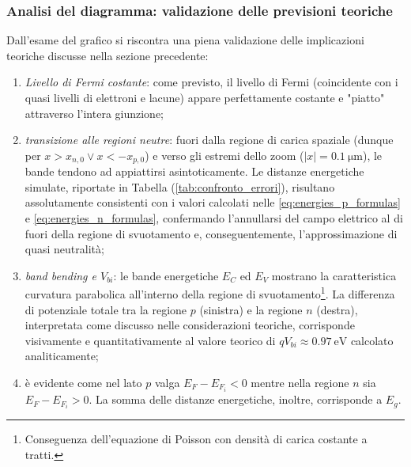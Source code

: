 \documentclass[a4paper,11pt]{report}
\begin{document}
\subsubsection{Analisi del diagramma: validazione delle previsioni teoriche}
Dall'esame del grafico si riscontra una piena validazione delle implicazioni teoriche discusse nella sezione precedente:
\begin{enumerate}
    \item \textit{Livello di Fermi costante}: come previsto, il livello di Fermi (coincidente con i quasi livelli di elettroni e lacune) appare perfettamente costante e "piatto" attraverso l'intera giunzione;
    
    \item \textit{transizione alle regioni neutre}: fuori dalla regione di carica spaziale (dunque per $x > x_{n,0} \lor x < -x_{p,0}$) e verso gli estremi dello zoom ($|x| = \SI{0.1}{\micro\meter}$), le bande tendono ad appiattirsi asintoticamente. Le distanze energetiche simulate, riportate in Tabella (\ref{tab:confronto_errori}), risultano assolutamente consistenti con i valori calcolati nelle \eqref{eq:energies_p_formulas} e \eqref{eq:energies_n_formulas}, confermando l'annullarsi del campo elettrico al di fuori della regione di svuotamento e, conseguentemente, l'approssimazione di quasi neutralità;

    \item \textit{band bending e $V_{bi}$}: le bande energetiche $E_C$ ed $E_V$ mostrano la caratteristica curvatura parabolica all'interno della regione di svuotamento\footnote{Conseguenza dell'equazione di Poisson con densità di carica costante a tratti.}. La differenza di potenziale totale tra la regione $p$ (sinistra) e la regione $n$ (destra), interpretata come discusso nelle considerazioni teoriche, corrisponde visivamente e quantitativamente al valore teorico di $qV_{bi} \approx \SI{0.97}{\electronvolt}$ calcolato analiticamente;
    
    \item è evidente come nel lato $p$ valga $E_{F} - E_{F_i} < 0$ mentre nella regione $n$ sia $E_{F} - E_{F_i} > 0$. La somma delle distanze energetiche, inoltre, corrisponde a $E_g$.
    \end{enumerate}
\end{document}
